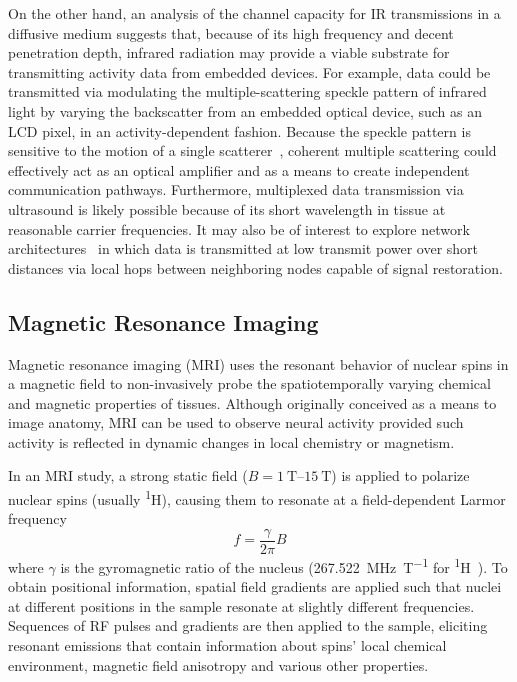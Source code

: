 On the other hand, an analysis of the channel capacity for IR transmissions in a diffusive medium suggests that, because of its high frequency and decent penetration depth, infrared radiation may provide a viable substrate for transmitting activity data from embedded devices.
For example, data could be transmitted via modulating the multiple-scattering speckle pattern of infrared light by varying the backscatter from an embedded optical device, such as an LCD pixel, in an activity-dependent fashion.
Because the speckle pattern is sensitive to the motion of a single scatterer~\cite{berkovits91}, coherent multiple scattering could effectively act as an optical amplifier and as a means to create independent communication pathways. Furthermore, multiplexed data transmission via ultrasound is likely possible because of its short wavelength in tissue at reasonable carrier frequencies.
It may also be of interest to explore network architectures~\cite{Bush2011} in which data is transmitted at low transmit power over short distances via local hops between neighboring nodes capable of signal restoration.

\subsection{Magnetic Resonance Imaging}

Magnetic resonance imaging (MRI) uses the resonant behavior of nuclear spins in a magnetic field to non-invasively probe the spatiotemporally varying chemical and magnetic properties of tissues.
Although originally conceived as a means to image anatomy, MRI can be used to observe neural activity provided such activity is reflected in dynamic changes in local chemistry or magnetism.

In an MRI study, a strong static field ($B = \SIrange{1}{15}{\tesla}$) is applied to polarize nuclear spins (usually \textsuperscript{1}H), causing them to resonate at a field-dependent Larmor frequency \[f = \frac{\gamma}{2\pi} B\] where $\gamma$ is the gyromagnetic ratio of the nucleus (\SI{267.522}{\mega\hertz\per\tesla} for \textsuperscript{1}H~\cite{codata10}).
To obtain positional information, spatial field gradients are applied such that nuclei at different positions in the sample resonate at slightly different frequencies.
Sequences of RF pulses and gradients are then applied to the sample, eliciting resonant emissions that contain information about spins' local chemical environment, magnetic field anisotropy and various other properties.

